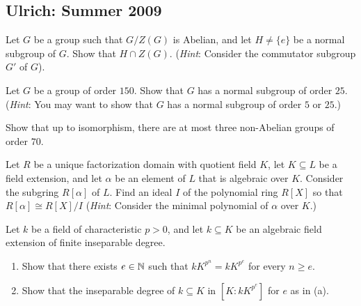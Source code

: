 \subsection{Ulrich: Summer 2009}
\setcounter{exercise}{0}
\setcounter{equation}{0}

\begin{problem}
  Let \(G\) be a group such that \(G/Z(G)\) is Abelian, and let
  \(H\neq\{e\}\) be a normal subgroup of \(G\). Show that \(H\cap
  Z(G)\). (\emph{Hint}: Consider  the commutator subgroup \(G'\) of
  \(G\)).
\end{problem}
\begin{solution}
\end{solution}

\begin{problem}
  Let \(G\) be a group of order \(150\). Show that \(G\) has a normal
  subgroup of order \(25\). (\emph{Hint}: You may want to show that \(G\)
  has a normal subgroup of order \(5\) or \(25\).)
\end{problem}
\begin{solution}
\end{solution}

\begin{problem}
  Show that up to isomorphism, there are at most three non-Abelian groups
  of order \(70\).
\end{problem}
\begin{solution}
\end{solution}

\begin{problem}
  Let \(R\) be a unique factorization domain with quotient field \(K\), let
  \(K\subseteq L\) be a field extension, and let \(\alpha\) be an element
  of \(L\) that is algebraic over \(K\). Consider the subgring
  \(R[\alpha]\) of \(L\). Find an ideal \(I\) of the polynomial ring
  \(R[X]\) so that \(R[\alpha]\cong R[X]/I\) (\emph{Hint}: Consider the
  minimal polynomial of \(\alpha\) over \(K\).)
\end{problem}
\begin{solution}
\end{solution}

\begin{problem}
  Let \(k\) be a field of characteristic \(p>0\), and let \(k\subseteq K\)
  be an algebraic field extension of finite inseparable degree.
  \begin{enumerate}[label=(\alph*),noitemsep]
  \item Show that there exists \(e\in\mathbb{N}\) such that \(kK^{p^n}=kK^{p^e}\)
    for every \(n\geq e\).
  \item Show that the inseparable degree of \(k\subseteq K\) in
    \([K:kK^{p^e}]\) for \(e\) as in (a).
  \end{enumerate}
\end{problem}
\begin{solution}
\end{solution}

